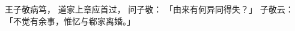 
\switchcolumn*[\section{}]

王子敬病笃，
道家上章应首过，
问子敬：
「由来有何异同得失？」
子敬云：
「不觉有余事，惟忆与郗家离婚。」

\switchcolumn



